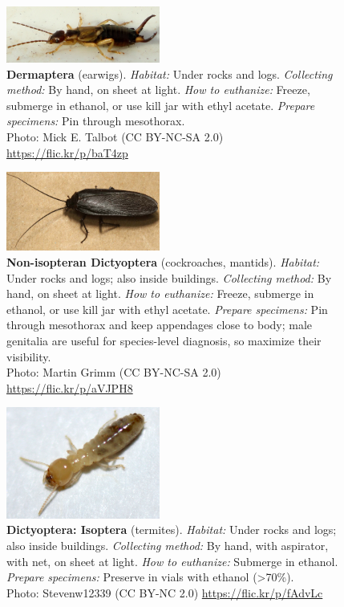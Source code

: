 \documentclass[letterpaper, 11pt]{article}
\begin{document}
\begin{figure}
  \caption{\textbf{Dermaptera} (earwigs). \textit{Habitat:} Under rocks and logs. \textit{Collecting method:} By hand, on sheet at light. \textit{How to euthanize:} Freeze, submerge in ethanol, or use kill jar with ethyl acetate. \textit{Prepare specimens:} Pin through mesothorax.\\ Photo: Mick E. Talbot (CC BY-NC-SA 2.0) \url{https://flic.kr/p/baT4zp}}
  \includegraphics[width=0.45\textwidth]{Dermaptera}
\end{figure}

\begin{figure}
  \caption{\textbf{Non-isopteran Dictyoptera} (cockroaches, mantids). \textit{Habitat:} Under rocks and logs; also inside buildings. \textit{Collecting method:} By hand, on sheet at light. \textit{How to euthanize:} Freeze, submerge in ethanol, or use kill jar with ethyl acetate. \textit{Prepare specimens:} Pin through mesothorax and keep appendages close to body; male genitalia are useful for species-level diagnosis, so maximize their visibility.\\Photo: Martin Grimm (CC BY-NC-SA 2.0) \url{https://flic.kr/p/aVJPH8}}
  \includegraphics[width=0.45\textwidth]{Blattodea}
\end{figure}

\clearpage

\begin{figure}
  \caption{\textbf{Dictyoptera: Isoptera} (termites). \textit{Habitat:} Under rocks and logs; also inside buildings. \textit{Collecting method:} By hand, with aspirator, with net, on sheet at light. \textit{How to euthanize:} Submerge in ethanol. \textit{Prepare specimens:} Preserve in vials with ethanol (\textgreater70\%). \\ Photo: Stevenw12339 (CC BY-NC 2.0) \url{https://flic.kr/p/fAdvLc}}
  \includegraphics[width=0.45\textwidth]{BlattodeaIsoptera}
\end{figure}
\end{document}
